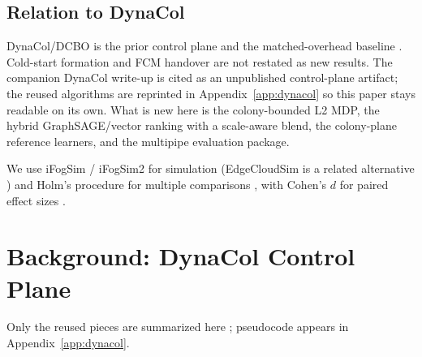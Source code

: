 \documentclass[11pt,a4paper]{article}
\begin{document}
\subsection{Relation to DynaCol}
DynaCol/DCBO is the prior control plane and the matched-overhead baseline
\cite{nabati_dynacol_cluster2026}. Cold-start formation and FCM handover are
not restated as new results. The companion DynaCol write-up is cited as an
unpublished control-plane artifact; the reused algorithms are reprinted in
Appendix~\ref{app:dynacol} so this paper stays readable on its own. What is new
here is the colony-bounded L2 MDP, the hybrid GraphSAGE/vector ranking with a
scale-aware blend, the colony-plane reference learners, and the multipipe
evaluation package.

\begin{table}[t]
\centering
\caption{Where Dyna-Bound sits relative to common placement families.}
\label{tab:positioning}
\scriptsize
\setlength{\tabcolsep}{3pt}
\end{table}

We use iFogSim / iFogSim2 for simulation
\cite{gupta_ifogsim2017,mahmud_ifogsim2_jss2022}
(EdgeCloudSim is a related alternative \cite{sonmez_edgecloudsim2018})
and Holm's procedure for multiple comparisons \cite{holm_1979}, with Cohen's
$d$ for paired effect sizes \cite{cohen_power1988}.

\section{Background: DynaCol Control Plane}
\label{sec:bg}

Only the reused pieces are summarized here
\cite{nabati_dynacol_cluster2026}; pseudocode appears in
Appendix~\ref{app:dynacol}.
\end{document}
